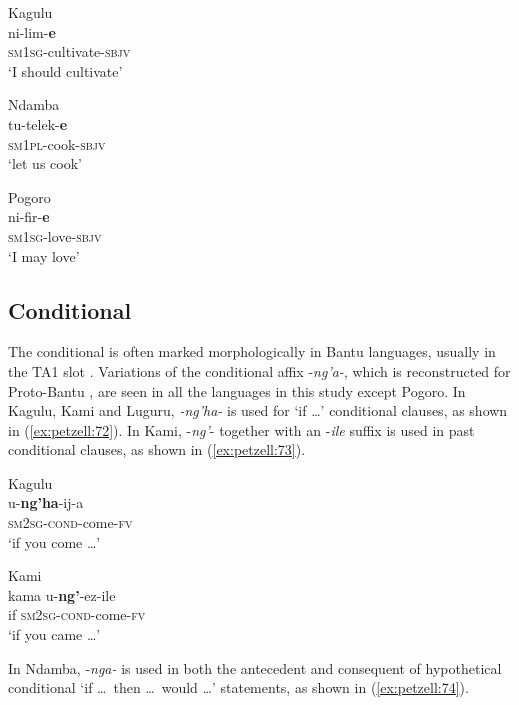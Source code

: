 \documentclass[output=paper,
            colorlinks, citecolor=brown
            ,draftmode
		  ]{langscibook}
\begin{document}
\ex\label{ex:petzell:69}Kagulu\\
\gll ni-lim-\textbf{e} \\
\textsc{sm}1\textsc{sg}{}-cultivate-\textsc{{sbjv}}\\
\glt `I should cultivate'


\ex\label{ex:petzell:70} Ndamba\\
\gll tu-telek-\textbf{e} \\
\textsc{sm}1\textsc{pl}{}-cook-\textsc{{sbjv}}\\
\glt `let us cook'


\ex \label{ex:petzell:71}Pogoro\\
\gll ni-fir-\textbf{e} \\
\textsc{sm}1\textsc{sg}{}-love-\textsc{{sbjv}}\\
\glt `I may love'
\z

\subsection{Conditional}\label{sec:petzell:4.3}

The conditional is often marked morphologically in Bantu languages, usually in the TA1 slot \citep[34]{Nurse2008}. Variations of the conditional affix -\textit{ng'a-}, which is reconstructed for Proto-Bantu \citep[113]{Meeussen1967}, are seen in all the languages in this study except Pogoro. In Kagulu, Kami and Luguru, \textit{\nobreakdash-ng'ha-} is used for `if \ldots' conditional clauses, as shown in  (\ref{ex:petzell:72}). In Kami, -\textit{ng'}{}- together with an -\textit{ile} suffix is used in past conditional clauses, as shown in  (\ref{ex:petzell:73}).


\ea\label{ex:petzell:72}Kagulu\\
\gll u-\textbf{ng'ha}{}-ij-a \\
\textsc{sm}2\textsc{sg}{}-\textsc{{cond}}{}-come-\textsc{fv}\\
\glt `if you come \ldots'


\ex\label{ex:petzell:73}Kami\\
\gll kama  u-\textbf{ng'}{}-ez-ile \\
if      \textsc{sm}2\textsc{sg}{}-\textsc{{cond}}{}-come-\textsc{fv}\\
\glt `if you came \ldots'
\z



In Ndamba, -\textit{nga-} is used in both the antecedent and consequent of hypothetical conditional `if \ldots\, then \ldots\, would \ldots' statements, as shown in  (\ref{ex:petzell:74}).
\end{document}
